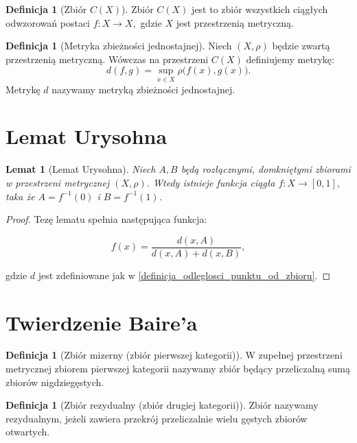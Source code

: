 \documentclass[licencjacka]{pwr_wmat_praca_dyplomowa}
\theoremstyle{plain}
\numberwithin{theorem}{chapter}
\newtheorem{lemma}[theorem]{Lemat}
\theoremstyle{definition}
\numberwithin{theorem}{chapter}
\newtheorem{definition}[theorem]{Definicja}
\begin{document}
\begin{definition}[Zbiór $C(X)$]
Zbiór $C(X)$ jest to zbiór wszystkich ciągłych odwzorowań postaci $f: X \rightarrow X,$ gdzie $X$ jest przestrzenią metryczną.
\end{definition}

\begin{definition}[Metryka zbieżności jednostajnej]
\label{definicja_zbieznosci_jednostajnej}
Niech $(X, \rho)$ będzie zwartą przestrzenią metryczną. Wówczas na przestrzeni $C(X)$ definiujemy metrykę:
$$d(f,g) = \sup_{x \in X} \rho\big(f(x), g(x)\big).$$
Metrykę $d$ nazywamy metryką zbieżności jednostajnej.
\end{definition}

{\color{red}
\section{Lemat Urysohna}

\begin{lemma}[Lemat Urysohna]
\label{lemat_urysohna}
Niech $A, B$ będą rozłącznymi, domkniętymi zbiorami w przestrzeni metrycznej $(X, \rho)$.
Wtedy istnieje funkcja ciągła $f: X \to [0,1],$ taka że $A=f^{-1}(0)$ i $B=f^{-1}(1)$.
\end{lemma}

\begin{proof}
Tezę lematu spełnia następująca funkcja:

$$f(x)=\frac{d(x,A)}{d(x,A)+d(x,B)},$$

gdzie $d$ jest zdefiniowane jak w \ref{definicja_odleglosci_punktu_od_zbioru}.
\end{proof}
}

\section{Twierdzenie Baire'a}

\begin{definition}[Zbiór mizerny (zbiór pierwszej kategorii)]
W zupełnej przestrzeni metrycznej zbiorem pierwszej kategorii nazywamy zbiór będący przeliczalną sumą zbiorów nigdziegęstych.
\end{definition}

\begin{definition}[Zbiór rezydualny (zbiór drugiej kategorii)]
\label{definicja_zbioru_rezydualnego}
Zbiór nazywamy rezydualnym, jeżeli zawiera przekrój przeliczalnie wielu gęstych zbiorów otwartych.
\end{definition}
\end{document}
